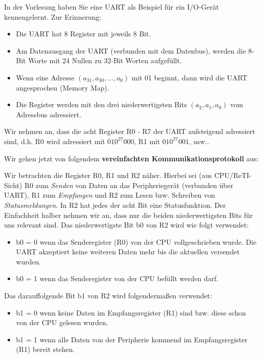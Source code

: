 \documentclass{article}
\begin{document}
In der Vorlesung haben Sie eine UART als Beispiel für ein I/O-Gerät kennengelernt. 
Zur Erinnerung:
\begin{itemize}
\item Die UART hat 8 Register mit jeweils 8 Bit.
\item Am Datenausgang der UART (verbunden mit dem Datenbus), werden die 8-Bit Worte mit 24 Nullen zu 32-Bit Worten aufgefüllt.
\item Wenn eine Adresse $(a_{31}, a_{30}, ..., a_0)$ mit 01 beginnt, dann wird die UART angesprochen (Memory Map).
\item Die Register werden mit den drei niederwertigsten Bits $(a_2, a_1, a_0)$ vom Adressbus adressiert.
\end{itemize}
Wir nehmen an, dass die acht Register R0 - R7 der UART aufsteigend adressiert sind, d.h. R0 wird adressiert mit $010^{27}000$, R1 mit $010^{27}001$, usw..

Wir gehen jetzt von folgendem \textbf{vereinfachten Kommunikationsprotokoll} aus:

Wir betrachten die Register R0, R1 und R2 näher. 
Hierbei sei (aus CPU/ReTI-Sicht) R0 zum \emph{Senden} von Daten an das Peripheriegerät (verbunden über UART), 
R1 zum \emph{Empfangen} und R2 zum Lesen bzw. Schreiben von \emph{Statusmeldungen}.
In R2 hat jedes der acht Bit eine Statusfunktion.
Der Einfachheit halber nehmen wir an, dass nur die beiden niederwertigsten Bits für uns relevant sind. 
Das niederwertigste Bit b0 von R2 wird wie folgt verwendet:
\begin{itemize}
\item b0 = 0 wenn das Senderegister (R0) von der CPU vollgeschrieben wurde. 
Die UART akzeptiert keine weiteren Daten mehr bis die aktuellen versendet wurden.
\item b0 = 1 wenn das Senderegister von der CPU befüllt werden darf.
\end{itemize}
Das darauffolgende Bit b1 von R2 wird folgendermaßen verwendet:
\begin{itemize}
\item b1 = 0 wenn keine Daten im Empfangsregister (R1) sind bzw. diese schon von der CPU gelesen wurden.
\item b1 = 1 wenn alle Daten von der Peripherie kommend im Empfangsregister (R1) bereit stehen.
\end{itemize}
\end{document}
